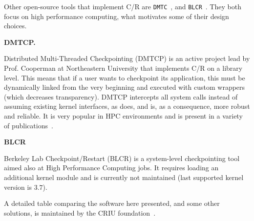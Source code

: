 Other open-source tools that implement C/R are \texttt{DMTC}~\cite{dmtcp}, and \texttt{BLCR}~\cite{blcr}.
They both focus on high performance computing, what motivates some of their design choices.

\textbf{DMTCP.}

Distributed Multi-Threaded Checkpointing (DMTCP) is an active project lead by Prof. Cooperman at Northeastern University that implements C/R on a library level.
This means that if a user wants to checkpoint its application, this must be dynamically linked from the very beginning and executed with custom wrappers (which decreases transparency).
DMTCP intercepts all system calls instead of assuming existing kernel interfaces, as \criu does, and is, as a consequence, more robust and reliable.
It is very popular in HPC environments and is present in a variety of publications~\cite{Ansel2009,Garg2019}.

\textbf{BLCR}

Berkeley Lab Checkpoint/Restart (BLCR) is a system-level checkpointing tool aimed also at High Performance Computing jobs.
It requires loading an additional kernel module and is currently not maintained (last supported kernel version is $3.7$).

A detailed table comparing the software here presented, and some other solutions, is maintained by the CRIU foundation~\cite{criu-comparison}.
